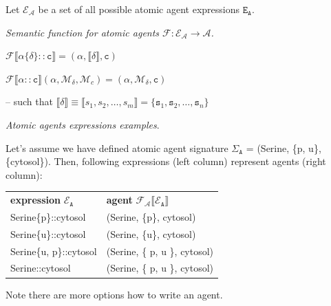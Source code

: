 \documentclass{elsarticle}
\begin{document}
\begin{definition}
Let $\mathcal{E}_\mathcal{A}$ be a set of all possible atomic agent expressions $\mathtt{E}_\mathtt{A}$.
\end{definition}

\begin{definition}
\textit{Semantic function for atomic agents $\mathcal{F}: \mathcal{E}_\mathcal{A} \rightarrow \mathcal{A}$.}

\begin{center}
$\mathcal{F} \llbracket \alpha\{\delta\}::\mathtt{c} \rrbracket = (\alpha, \llbracket \delta \rrbracket, \mathtt{c})$

$\mathcal{F} \llbracket \alpha::\mathtt{c} \rrbracket (\alpha, \mathcal{M}_\delta, \mathcal{M}_c) = (\alpha, \mathcal{M}_\delta, \mathtt{c})$

\bigskip

-- such that $ \llbracket \delta \rrbracket \equiv \llbracket s_1, s_2, \ldots, s_m \rrbracket = \{\mathtt{s}_1, \mathtt{s}_2, \ldots, \mathtt{s}_n\}$
\end{center}
\end{definition}


\begin{example}\label{atomic_expression_examples}
\textit{Atomic agents expressions examples}.


Let's assume we have defined atomic agent signature $\Sigma_\mathtt{A}$ = (Serine, \{p, u\}, \{cytosol\}). Then, following expressions (left column) represent agents (right column):

\begin{center}
\begin{tabular}{ l | l }
\textbf{expression} $\mathcal{E}_\mathtt{A}$ & \textbf{agent} $\mathcal{F}_\mathcal{A} \llbracket \mathcal{E}_\mathtt{A} \rrbracket$ \\
Serine\{p\}::cytosol & (Serine, \{p\}, cytosol) \\
Serine\{u\}::cytosol & (Serine, \{u\}, cytosol) \\
Serine\{u, p\}::cytosol & (Serine, \{ p, u \}, cytosol) \\
Serine::cytosol & (Serine, \{ p, u \}, cytosol) \\
\end{tabular}
\end{center}

Note there are more options how to write an agent.

\end{example}
\end{document}
